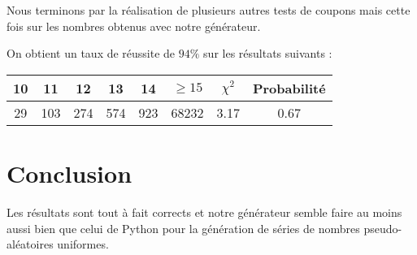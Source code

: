 \documentclass[12pt,a4paper]{article}
\begin{document}
Nous terminons par la réalisation de plusieurs autres tests de coupons mais
cette fois sur les nombres obtenus avec notre générateur.

On obtient un taux de réussite de $94\%$ sur les résultats suivants :

\begin{center}
\begin{tabular}{c|c|c|c|c|c|c|c}
10 & 11 & 12 & 13 & 14 & $\geq 15$ & $\chi^2$ & Probabilité \\ \hline
29 & 103 & 274 & 574 & 923 & 68232 &  3.17 &  0.67
\end{tabular}
\end{center}


\section{Conclusion}
Les résultats sont tout à fait corrects et notre générateur semble faire
au moins aussi bien que celui de Python pour la génération de séries de nombres
pseudo-aléatoires uniformes.
\end{document}
